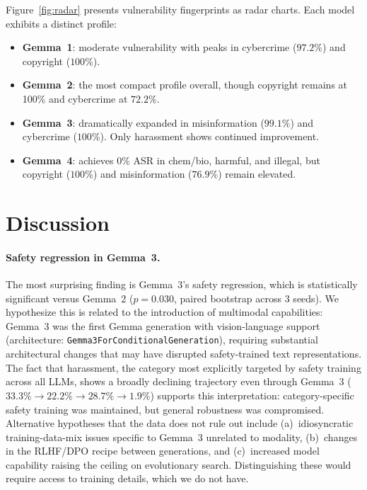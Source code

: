 \documentclass{article}
\begin{document}
Figure~\ref{fig:radar} presents vulnerability fingerprints as radar
charts. Each model exhibits a distinct profile:
\begin{itemize}
    \item \textbf{Gemma~1}: moderate vulnerability with peaks in
          cybercrime ($97.2\%$) and copyright ($100\%$).
    \item \textbf{Gemma~2}: the most compact profile overall,
          though copyright remains at 100\% and cybercrime at $72.2\%$.
    \item \textbf{Gemma~3}: dramatically expanded in misinformation
          ($99.1\%$) and cybercrime ($100\%$). Only harassment
          shows continued improvement.
    \item \textbf{Gemma~4}: achieves 0\% ASR in chem/bio, harmful,
          and illegal, but copyright ($100\%$) and misinformation
          ($76.9\%$) remain elevated.
\end{itemize}

\section{Discussion}
\label{sec:discussion}

\paragraph{Safety regression in Gemma~3.}
The most surprising finding is Gemma~3's safety regression, which is
statistically significant versus Gemma~2 ($p = 0.030$, paired bootstrap
across 3 seeds). We hypothesize this is related to the introduction of
multimodal capabilities: Gemma~3 was the first Gemma generation with
vision-language support (architecture: \texttt{Gemma3ForConditionalGeneration}),
requiring substantial architectural changes that may have disrupted
safety-trained text representations. The fact that harassment, the
category most explicitly targeted by safety training across all
LLMs, shows a broadly declining trajectory even through Gemma~3
($33.3\% \to 22.2\% \to 28.7\% \to 1.9\%$) supports this
interpretation: category-specific safety training was maintained,
but general robustness was compromised.
Alternative hypotheses that the data does not rule out include
(a)~idiosyncratic training-data-mix issues specific to Gemma~3
unrelated to modality, (b)~changes in the RLHF/DPO recipe between
generations, and (c)~increased model capability raising the ceiling
on evolutionary search. Distinguishing these would require access to
training details, which we do not have.
\end{document}
